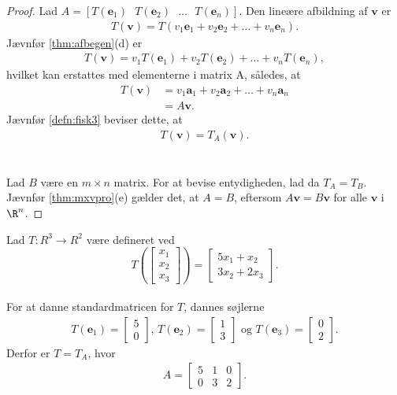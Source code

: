 \begin{proof}
Lad $A= [T(\mathbf{e}_1)\text{    } T(\mathbf{e}_2) \text{    } \ldots \text{    } T(\mathbf{e}_n)]$. 
Den lineære afbildning af $\mathbf{v}$ er
%
\begin{align*}
T(\mathbf{v})= T(v_1 \mathbf{e}_1+v_2 \mathbf{e}_2+ \ldots + v_n \mathbf{e}_n).
\end{align*}
%
Jævnfør \ref{thm:afbegen}(d) er
%
\begin{align*}
T(\mathbf{v})= v_1 T( \mathbf{e}_1)+ v_2 T( \mathbf{e}_2) + \ldots + v_n T( \mathbf{e}_n),
\end{align*}
%
hvilket kan erstattes med elementerne i matrix A, således, at
%
\begin{align*}
T(\mathbf{v})&= v_1 \mathbf{a}_1+ v_2 \mathbf{a}_2 + \ldots + v_n \mathbf{a}_n \\
&= A \mathbf{v}.
\end{align*}
Jævnfør \ref{defn:fisk3} beviser dette, at
%
\begin{align*}
T(\mathbf{v})= T_A (\mathbf{v}).
\end{align*}\\\\
%
Lad $B$ være en $m \times n$ matrix. 
For at bevise entydigheden, lad da $T_A=T_B$. 
Jævnfør \ref{thm:mxvpro}(e) gælder det, at $A=B$, eftersom $A \mathbf{v}=B \mathbf{v}$ for alle $\mathbf{v}$ i $\R^n$.
\end{proof}
%
\begin{eks}\label{entydigeks}
%
Lad $T: R^3 \rightarrow R^2$ være defineret ved 
$$T\left(
\begin{bmatrix}
x_1\\
x_2\\
x_3
\end{bmatrix}
\right)
=
\begin{bmatrix}%
5x_1+x_2\\
3x_2+2x_3
\end{bmatrix}.
$$ \\
For at danne standardmatricen for $T$, dannes søjlerne 
\begin{align*}
T(\mathbf{e}_1)=
\begin{bmatrix}
5\\
0
\end{bmatrix}\text{, }
T(\mathbf{e}_2)=
\begin{bmatrix}
1\\
3
\end{bmatrix}\text{ og }
T(\mathbf{e}_3)=
\begin{bmatrix}
0\\
2
\end{bmatrix}.
\end{align*}
Derfor er $T = T_A$, hvor
\begin{align*}
A=
\begin{bmatrix}
5 & 1 & 0\\
0 & 3 & 2
\end{bmatrix}.
\end{align*}
\end{eks}